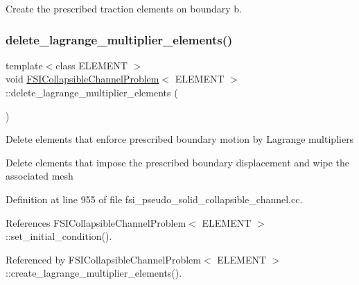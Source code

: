 Create the prescribed traction elements on boundary b. 

\mbox{\label{classFSICollapsibleChannelProblem_ab853c978c8e94505cd36781569b1dbf1}} 
\subsubsection{\texorpdfstring{delete\+\_\+lagrange\+\_\+multiplier\+\_\+elements()}{delete\_lagrange\_multiplier\_elements()}\hspace{0.1cm}{\footnotesize\ttfamily [1/2]}}
{\footnotesize\ttfamily template$<$class E\+L\+E\+M\+E\+NT $>$ \\
void \hyperlink{classFSICollapsibleChannelProblem}{F\+S\+I\+Collapsible\+Channel\+Problem}$<$ E\+L\+E\+M\+E\+NT $>$\+::delete\+\_\+lagrange\+\_\+multiplier\+\_\+elements (\begin{DoxyParamCaption}{ }\end{DoxyParamCaption})\hspace{0.3cm}{\ttfamily [private]}}

Delete elements that enforce prescribed boundary motion by Lagrange multipliers

Delete elements that impose the prescribed boundary displacement and wipe the associated mesh 

Definition at line 955 of file fsi\+\_\+pseudo\+\_\+solid\+\_\+collapsible\+\_\+channel.\+cc.



References F\+S\+I\+Collapsible\+Channel\+Problem$<$ E\+L\+E\+M\+E\+N\+T $>$\+::set\+\_\+initial\+\_\+condition().



Referenced by F\+S\+I\+Collapsible\+Channel\+Problem$<$ E\+L\+E\+M\+E\+N\+T $>$\+::create\+\_\+lagrange\+\_\+multiplier\+\_\+elements().

\mbox{\label{classFSICollapsibleChannelProblem_ab853c978c8e94505cd36781569b1dbf1}} 
